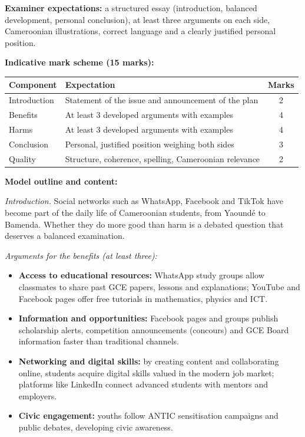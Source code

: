 \documentclass[11pt]{article}
\begin{document}
\begin{corrige}
\textbf{Examiner expectations:} a structured essay (introduction, balanced development, personal conclusion), at least three arguments on each side, Cameroonian illustrations, correct language and a clearly justified personal position.

\textbf{Indicative mark scheme (15 marks):}
\begin{center}
\begin{tabularx}{\linewidth}{|l|X|c|}
\hline
\rowcolor{popblueL} \textbf{Component} & \textbf{Expectation} & \textbf{Marks} \\ \hline
Introduction & Statement of the issue and announcement of the plan & 2 \\ \hline
Benefits & At least 3 developed arguments with examples & 4 \\ \hline
Harms & At least 3 developed arguments with examples & 4 \\ \hline
Conclusion & Personal, justified position weighing both sides & 3 \\ \hline
Quality & Structure, coherence, spelling, Cameroonian relevance & 2 \\ \hline
\end{tabularx}
\end{center}

\textbf{Model outline and content:}

\emph{Introduction.} Social networks such as WhatsApp, Facebook and TikTok have become part of the daily life of Cameroonian students, from Yaoundé to Bamenda. Whether they do more good than harm is a debated question that deserves a balanced examination.

\emph{Arguments for the benefits (at least three):}
\begin{itemize}
    \item \textbf{Access to educational resources:} WhatsApp study groups allow classmates to share past GCE papers, lessons and explanations; YouTube and Facebook pages offer free tutorials in mathematics, physics and ICT.
    \item \textbf{Information and opportunities:} Facebook pages and groups publish scholarship alerts, competition announcements (concours) and GCE Board information faster than traditional channels.
    \item \textbf{Networking and digital skills:} by creating content and collaborating online, students acquire digital skills valued in the modern job market; platforms like LinkedIn connect advanced students with mentors and employers.
    \item \textbf{Civic engagement:} youths follow ANTIC sensitisation campaigns and public debates, developing civic awareness.
\end{itemize}


\end{corrige}
\end{document}
